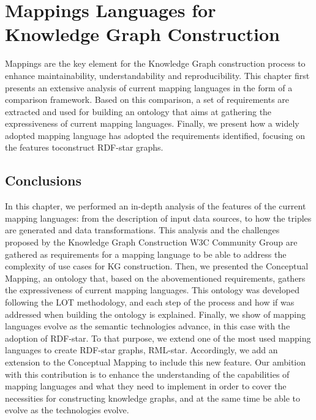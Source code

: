 
\chapter{Mappings Languages for Knowledge Graph Construction}
\label{chapter:mappings}

Mappings are the key element for the Knowledge Graph construction process to enhance maintainability, understandability and reproducibility. This chapter first presents an extensive analysis of current mapping languages in the form of a comparison framework. Based on this comparison, a set of requirements are extracted and used for building an ontology that aims at gathering the expressiveness of current mapping languages. Finally, we present how a widely adopted mapping language has adopted the requirements identified, focusing on the features toconstruct RDF-star graphs.








\section{Conclusions}

In this chapter, we performed an in-depth analysis of the features of the current mapping languages: from the description of input data sources, to how the triples are generated and data transformations. This analysis and the challenges proposed by the Knowledge Graph Construction W3C Community Group are gathered as requirements for a mapping language to be able to address the complexity of use cases for KG construction. Then, we presented the Conceptual Mapping, an ontology that, based on the abovementioned requirements, gathers the expressiveness of current mapping languages. This ontology was developed following the LOT methodology, and each step of the process and how if was addressed when building the ontology is explained. Finally, we show of mapping languages evolve as the semantic technologies advance, in this case with the adoption of RDF-star. To that purpose, we extend one of the most used mapping languages to create RDF-star graphs, RML-star. Accordingly, we add an extension to the Conceptual Mapping to include this new feature. Our ambition with this contribution is to enhance the understanding of the capabilities of mapping languages and what they need to implement in order to cover the necessities for constructing knowledge graphs, and at the same time be able to evolve as the technologies evolve.